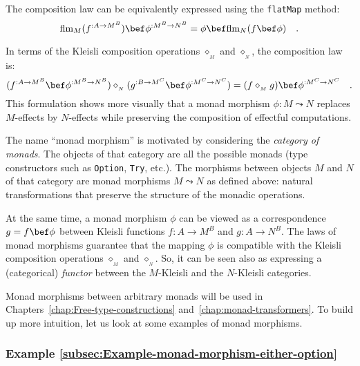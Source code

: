 The composition law can
be equivalently expressed using the \lstinline!flatMap! method:
\begin{equation}
\text{flm}_{M}(f^{:A\rightarrow M^{B}})\bef\phi^{:M^{B}\rightarrow N^{B}}=\phi\bef\text{flm}_{N}(f\bef\phi)\quad.\label{eq:monad-morphism-composition-law-using-flatMap}
\end{equation}

In terms of the Kleisli composition operations $\diamond_{_{M}}$
and $\diamond_{_{N}}$, the composition law is:
\[
(f^{:A\rightarrow M^{B}}\bef\phi^{:M^{B}\rightarrow N^{B}})\diamond_{_{N}}(g^{:B\rightarrow M^{C}}\bef\phi^{:M^{C}\rightarrow N^{C}})=(f\diamond_{_{M}}g)\bef\phi^{:M^{C}\rightarrow N^{C}}\quad.
\]
This formulation shows more visually that a monad morphism $\phi:M\leadsto N$
replaces $M$-effects by $N$-effects while preserving the composition
of effectful computations.

The name \textsf{``}monad morphism\textsf{''} is motivated by considering the \emph{category
of monads}.
The objects of that category are all the possible monads (type constructors
such as \lstinline!Option!, \lstinline!Try!, etc.). The morphisms
between objects $M$ and $N$ of that category are monad morphisms
$M\leadsto N$ as defined above: natural transformations that preserve
the structure of the monadic operations.

At the same time, a monad morphism $\phi$ can be viewed as a correspondence
$g=f\bef\phi$ between Kleisli functions $f:A\rightarrow M^{B}$ and
$g:A\rightarrow N^{B}$. The laws of monad morphisms guarantee that
the mapping $\phi$ is compatible with the Kleisli composition operations
$\diamond_{_{M}}$ and $\diamond_{_{N}}$. So, it can be seen also
as expressing a (categorical) \emph{functor}
between the $M$-Kleisli and the $N$-Kleisli categories.

Monad morphisms between arbitrary monads will be used in Chapters~\ref{chap:Free-type-constructions}
and~\ref{chap:monad-transformers}. To build up more intuition, let
us look at some examples of monad morphisms.

\subsubsection{Example \label{subsec:Example-monad-morphism-either-option}\ref{subsec:Example-monad-morphism-either-option}}

